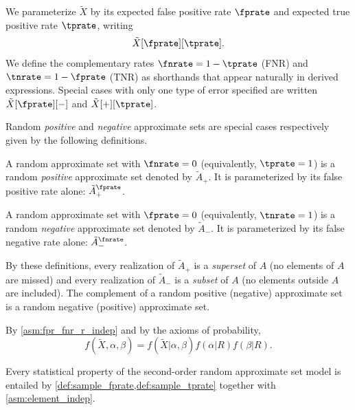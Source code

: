 We parameterize $\tilde{X}$ by its expected false positive rate $\fprate$ and expected true positive rate $\tprate$, writing
\begin{equation}
\tilde{X}[\fprate][\tprate].
\end{equation}
We define the complementary rates $\fnrate = 1-\tprate$ (FNR) and $\tnrate = 1-\fprate$ (TNR) as shorthands that appear naturally in derived expressions.
Special cases with only one type of error specified are written $\tilde{X}[\fprate][-]$ and $\tilde{X}[+][\tprate]$.

Random \emph{positive} and \emph{negative} approximate sets are special cases respectively given by the following definitions.
\begin{definition}
\label{def:pos_approx_set}
A random approximate set with $\fnrate = 0$ (equivalently, $\tprate = 1$) is a random \emph{positive} approximate set denoted by $\tilde{A}_+$.
It is parameterized by its false positive rate alone: $\tilde{A}_+^\fprate$.
\end{definition}
\begin{definition}
\label{def:neg_approx_set}
A random approximate set with $\fprate = 0$ (equivalently, $\tnrate = 1$) is a random \emph{negative} approximate set denoted by $\tilde{A}_-$.
It is parameterized by its false negative rate alone: $\tilde{A}_-^\fnrate$.
\end{definition}
By these definitions, every realization of $\tilde{A}_+$ is a \emph{superset} of $A$ (no elements of $A$ are missed) and every realization of $\tilde{A}_-$ is a \emph{subset} of $A$ (no elements outside $A$ are included).
The complement of a random positive (negative) approximate set is a random negative (positive) approximate set.

By \cref{asm:fpr_fnr_r_indep} and by the axioms of probability,
\begin{equation}
f(\tilde{X}, \alpha, \beta) =
f(\tilde{X} | \alpha, \beta)
f(\alpha | R) f(\beta | R).
\end{equation}

Every statistical property of the second-order random approximate set model is entailed by \cref{def:sample_fprate,def:sample_tprate} together with \cref{asm:element_indep}.

